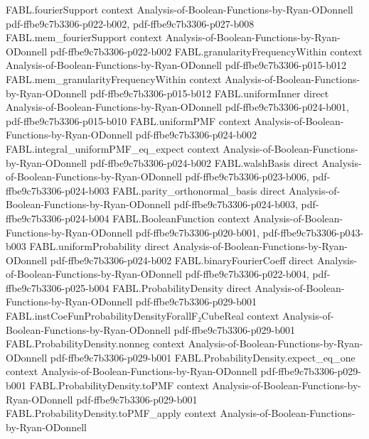 \begin{theorem}
\proofstep
  {FABL.fourierSupport}
  {context}
  {Analysis-of-Boolean-Functions-by-Ryan-ODonnell}
  {pdf-ffbe9c7b3306-p022-b002,
    pdf-ffbe9c7b3306-p027-b008}
\proofstep
  {FABL.mem_fourierSupport}
  {context}
  {Analysis-of-Boolean-Functions-by-Ryan-ODonnell}
  {pdf-ffbe9c7b3306-p022-b002}
\proofstep
  {FABL.granularityFrequencyWithin}
  {context}
  {Analysis-of-Boolean-Functions-by-Ryan-ODonnell}
  {pdf-ffbe9c7b3306-p015-b012}
\proofstep
  {FABL.mem_granularityFrequencyWithin}
  {context}
  {Analysis-of-Boolean-Functions-by-Ryan-ODonnell}
  {pdf-ffbe9c7b3306-p015-b012}
\proofstep
  {FABL.uniformInner}
  {direct}
  {Analysis-of-Boolean-Functions-by-Ryan-ODonnell}
  {pdf-ffbe9c7b3306-p024-b001,
    pdf-ffbe9c7b3306-p015-b010}
\proofstep
  {FABL.uniformPMF}
  {context}
  {Analysis-of-Boolean-Functions-by-Ryan-ODonnell}
  {pdf-ffbe9c7b3306-p024-b002}
\proofstep
  {FABL.integral_uniformPMF_eq_expect}
  {context}
  {Analysis-of-Boolean-Functions-by-Ryan-ODonnell}
  {pdf-ffbe9c7b3306-p024-b002}
\proofstep
  {FABL.walshBasis}
  {direct}
  {Analysis-of-Boolean-Functions-by-Ryan-ODonnell}
  {pdf-ffbe9c7b3306-p023-b006,
    pdf-ffbe9c7b3306-p024-b003}
\proofstep
  {FABL.parity_orthonormal_basis}
  {direct}
  {Analysis-of-Boolean-Functions-by-Ryan-ODonnell}
  {pdf-ffbe9c7b3306-p024-b003,
    pdf-ffbe9c7b3306-p024-b004}
\proofstep
  {FABL.BooleanFunction}
  {context}
  {Analysis-of-Boolean-Functions-by-Ryan-ODonnell}
  {pdf-ffbe9c7b3306-p020-b001,
    pdf-ffbe9c7b3306-p043-b003}
\proofstep
  {FABL.uniformProbability}
  {direct}
  {Analysis-of-Boolean-Functions-by-Ryan-ODonnell}
  {pdf-ffbe9c7b3306-p024-b002}
\proofstep
  {FABL.binaryFourierCoeff}
  {direct}
  {Analysis-of-Boolean-Functions-by-Ryan-ODonnell}
  {pdf-ffbe9c7b3306-p022-b004,
    pdf-ffbe9c7b3306-p025-b004}
\proofstep
  {FABL.ProbabilityDensity}
  {direct}
  {Analysis-of-Boolean-Functions-by-Ryan-ODonnell}
  {pdf-ffbe9c7b3306-p029-b001}
\proofstep
  {FABL.instCoeFunProbabilityDensityForallF₂CubeReal}
  {context}
  {Analysis-of-Boolean-Functions-by-Ryan-ODonnell}
  {pdf-ffbe9c7b3306-p029-b001}
\proofstep
  {FABL.ProbabilityDensity.nonneg}
  {context}
  {Analysis-of-Boolean-Functions-by-Ryan-ODonnell}
  {pdf-ffbe9c7b3306-p029-b001}
\proofstep
  {FABL.ProbabilityDensity.expect_eq_one}
  {context}
  {Analysis-of-Boolean-Functions-by-Ryan-ODonnell}
  {pdf-ffbe9c7b3306-p029-b001}
\proofstep
  {FABL.ProbabilityDensity.toPMF}
  {context}
  {Analysis-of-Boolean-Functions-by-Ryan-ODonnell}
  {pdf-ffbe9c7b3306-p029-b001}
\proofstep
  {FABL.ProbabilityDensity.toPMF_apply}
  {context}
  {Analysis-of-Boolean-Functions-by-Ryan-ODonnell}

\end{theorem}
